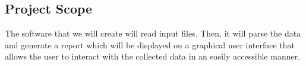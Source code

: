 \subsection{Project Scope}

The software that we will create will read input files. Then, it will parse the data and generate a report which will be displayed on a graphical user interface that allows the user to interact with the collected data in an easily accessible manner.

